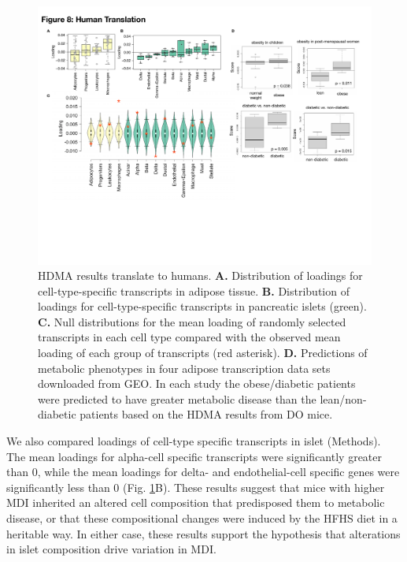\documentclass[
]{article}
\begin{document}
\begin{figure}[ht!]
\includegraphics[width=\textwidth]{Figures/Fig8_Human_Translation.pdf} 
\caption{HDMA results translate to humans. \textbf{A.} Distribution of 
loadings for cell-type-specific transcripts in adipose tissue. \textbf{B.} 
Distribution of loadings for cell-type-specific transcripts in pancreatic 
islets (green). \textbf{C.} Null distributions for the mean loading of 
randomly selected transcripts in each cell type compared with the observed 
mean loading of each group of transcripts (red asterisk). \textbf{D.} 
Predictions of metabolic phenotypes in four adipose transcription data 
sets downloaded from GEO. In each study the obese/diabetic patients were 
predicted to have greater metabolic disease than the lean/non-diabetic 
patients based on the HDMA results from DO mice.
}
\label{fig:human_translation}
\end{figure}

We also compared loadings of cell-type specific transcripts in islet
(Methods). The mean loadings for alpha-cell specific transcripts were
significantly greater than 0, while the mean loadings for delta- and
endothelial-cell specific genes were significantly less than 0 (Fig.
\ref{fig:human_translation}B). These results suggest that mice with
higher MDI inherited an altered cell composition that predisposed them
to metabolic disease, or that these compositional changes were induced
by the HFHS diet in a heritable way. In either case, these results
support the hypothesis that alterations in islet composition drive
variation in MDI.
\end{document}
